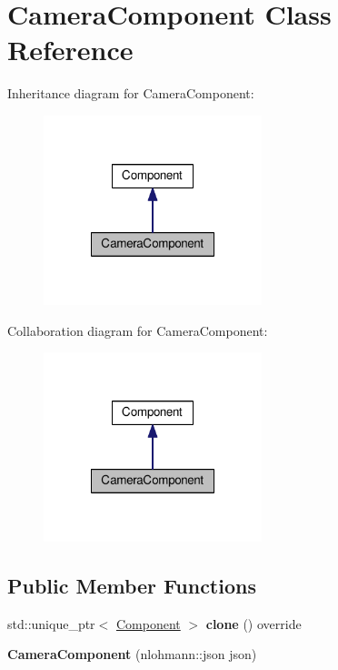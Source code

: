 \hypertarget{classCameraComponent}{\section{Camera\-Component Class Reference}
\label{classCameraComponent}
}


Inheritance diagram for Camera\-Component\-:
\nopagebreak
\begin{figure}[H]
\begin{center}
\leavevmode
\includegraphics[width=180pt]{classCameraComponent__inherit__graph}
\end{center}
\end{figure}


Collaboration diagram for Camera\-Component\-:
\nopagebreak
\begin{figure}[H]
\begin{center}
\leavevmode
\includegraphics[width=180pt]{classCameraComponent__coll__graph}
\end{center}
\end{figure}
\subsection*{Public Member Functions}
\begin{DoxyCompactItemize}
\item 
\hypertarget{classCameraComponent_a820ca92b75c521612c6f20b28dbcf2ab}{std\-::unique\-\_\-ptr$<$ \hyperlink{classComponent}{Component} $>$ {\bfseries clone} () override}\label{classCameraComponent_a820ca92b75c521612c6f20b28dbcf2ab}

\item 
\hypertarget{classCameraComponent_a9cc82e3d7e147397d7052c2e327196a3}{{\bfseries Camera\-Component} (nlohmann\-::json json)}\label{classCameraComponent_a9cc82e3d7e147397d7052c2e327196a3}

\end{DoxyCompactItemize}
